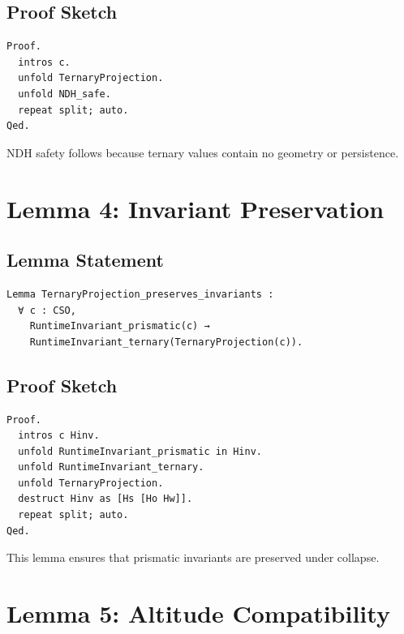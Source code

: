 \documentclass[11pt]{article}
\begin{document}
\subsection{Proof Sketch}

\begin{verbatim}
Proof.
  intros c.
  unfold TernaryProjection.
  unfold NDH_safe.
  repeat split; auto.
Qed.
\end{verbatim}

NDH safety follows because ternary values contain no geometry or persistence.

\newpage


\section{Lemma 4: Invariant Preservation}

\subsection{Lemma Statement}

\begin{verbatim}
Lemma TernaryProjection_preserves_invariants :
  ∀ c : CSO,
    RuntimeInvariant_prismatic(c) →
    RuntimeInvariant_ternary(TernaryProjection(c)).
\end{verbatim}

\subsection{Proof Sketch}

\begin{verbatim}
Proof.
  intros c Hinv.
  unfold RuntimeInvariant_prismatic in Hinv.
  unfold RuntimeInvariant_ternary.
  unfold TernaryProjection.
  destruct Hinv as [Hs [Ho Hw]].
  repeat split; auto.
Qed.
\end{verbatim}

This lemma ensures that prismatic invariants are preserved under collapse.

\newpage


\section{Lemma 5: Altitude Compatibility}
\end{document}

